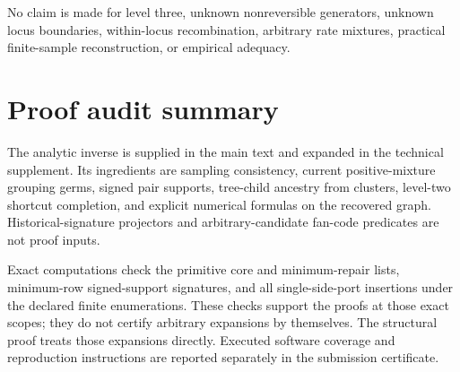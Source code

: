 \documentclass[11pt]{article}
\begin{document}
No claim is made for level three, unknown nonreversible generators, unknown
locus boundaries, within-locus recombination, arbitrary rate mixtures,
practical finite-sample reconstruction, or empirical adequacy.

\section{Proof audit summary}
The analytic inverse is supplied in the main text and expanded in the
technical supplement.  Its ingredients are sampling consistency, current
positive-mixture grouping germs, signed pair supports, tree-child ancestry
from clusters, level-two shortcut completion, and explicit numerical
formulas on the recovered graph.  Historical-signature projectors and
arbitrary-candidate fan-code predicates are not proof inputs.

Exact computations check the primitive core and minimum-repair lists,
minimum-row signed-support signatures, and all single-side-port insertions
under the declared finite enumerations.  These checks support the proofs at
those exact scopes; they do not certify arbitrary expansions by themselves.
The structural proof treats those expansions directly.  Executed software
coverage and reproduction instructions are reported separately in the
submission certificate.
\end{document}
